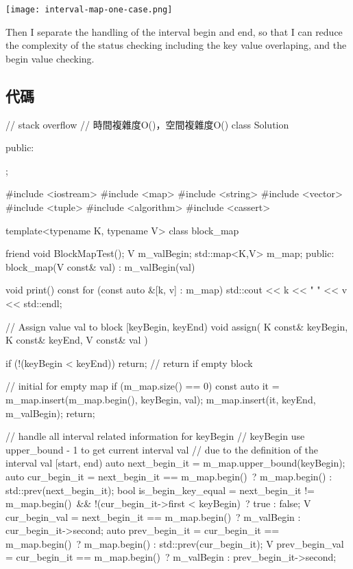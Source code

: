 \begin{center}
\texttt{[image: interval-map-one-case.png]}\\
\label{fig:interval-map-one-case}
\end{center}

Then I separate the handling of the interval begin and end, so that I can reduce the complexity of the status checking including the key value overlaping, and the begin value checking.


\subsection{代碼}
\begin{Code}
// stack overflow
// 時間複雜度O()，空間複雜度O()
class Solution {
public:

};

#include <iostream>
#include <map>
#include <string>
#include <vector>
#include <tuple>
#include <algorithm>
#include <cassert>

template<typename K, typename V>
class block_map {
    friend void BlockMapTest();
    V m_valBegin;
    std::map<K,V> m_map;
public:
    block_map(V const& val)
        : m_valBegin(val)
    {}

    void print() const
    {
        for (const auto &[k, v] : m_map)
        {
            std::cout << k << " " << v << std::endl;
        }
    }

    // Assign value val to block [keyBegin, keyEnd)
    void assign( K const& keyBegin, K const& keyEnd, V const& val ) {
        if (!(keyBegin < keyEnd)) return; // return if empty block

        // initial for empty map
        if (m_map.size() == 0)
        {
            const auto it = m_map.insert(m_map.begin(), {keyBegin, val});
            m_map.insert(it, {keyEnd, m_valBegin});
            return;
        }

        // handle all interval related information for keyBegin
        // keyBegin use upper_bound - 1 to get current interval val
        // due to the definition of the interval val [start, end)
        auto next_begin_it = m_map.upper_bound(keyBegin);
        auto cur_begin_it = next_begin_it == m_map.begin()\
                            ? m_map.begin() : std::prev(next_begin_it);
        bool is_begin_key_equal = next_begin_it != m_map.begin()\
                                   && !(cur_begin_it->first < keyBegin)\
                                    ? true : false;
        V cur_begin_val = next_begin_it == m_map.begin()\
                           ? m_valBegin : cur_begin_it->second;
        auto prev_begin_it = cur_begin_it == m_map.begin()\
                              ? m_map.begin() : std::prev(cur_begin_it);
        V prev_begin_val = cur_begin_it == m_map.begin()\
                            ? m_valBegin : prev_begin_it->second;

}}
\end{Code}
